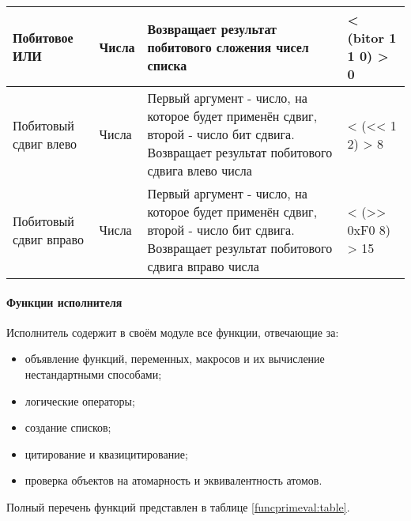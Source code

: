 \begin{xltabular}{\textwidth}{|p{3.6cm}|p{2cm}|p{6cm}|X|}
	Побитовое ИЛИ & Числа & Возвращает результат побитового сложения чисел списка & < (bitor 1 1 0) \linebreak > 0 \\ \hline 
	Побитовый сдвиг влево & Числа & Первый аргумент - число, на которое будет применён сдвиг, второй - число бит сдвига. Возвращает результат побитового сдвига влево числа & < (<< 1 2) \linebreak > 8 \\ \hline 
	Побитовый сдвиг вправо & Числа & Первый аргумент - число, на которое будет применён сдвиг, второй - число бит сдвига. Возвращает результат побитового сдвига вправо числа & < (>> 0xF0 8) \linebreak > 15
\end{xltabular}

\paragraph{Функции исполнителя}

Исполнитель содержит в своём модуле все функции, отвечающие за:
\begin{itemize}
	\item объявление функций, переменных, макросов и их вычисление нестандартными способами;
	\item логические операторы;
	\item создание списков;
	\item цитирование и квазицитирование;
	\item проверка объектов на атомарность и эквивалентность атомов.
\end{itemize}

Полный перечень функций представлен в таблице \ref{funcprimeval:table}.

